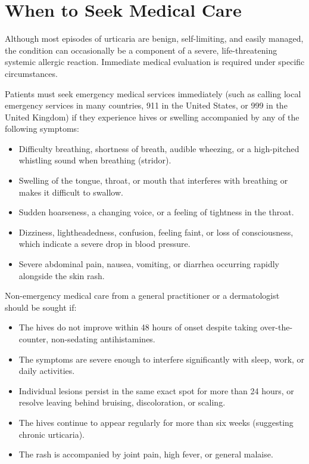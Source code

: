 \section*{When to Seek Medical Care}
Although most episodes of urticaria are benign, self-limiting, and easily managed, the condition can occasionally be a component of a severe, life-threatening systemic allergic reaction. Immediate medical evaluation is required under specific circumstances.

Patients must seek emergency medical services immediately (such as calling local emergency services in many countries, 911 in the United States, or 999 in the United Kingdom) if they experience hives or swelling accompanied by any of the following symptoms:
\begin{itemize}
    \item Difficulty breathing, shortness of breath, audible wheezing, or a high-pitched whistling sound when breathing (stridor).
    \item Swelling of the tongue, throat, or mouth that interferes with breathing or makes it difficult to swallow.
    \item Sudden hoarseness, a changing voice, or a feeling of tightness in the throat.
    \item Dizziness, lightheadedness, confusion, feeling faint, or loss of consciousness, which indicate a severe drop in blood pressure.
    \item Severe abdominal pain, nausea, vomiting, or diarrhea occurring rapidly alongside the skin rash.
\end{itemize}

Non-emergency medical care from a general practitioner or a dermatologist should be sought if:
\begin{itemize}
    \item The hives do not improve within 48 hours of onset despite taking over-the-counter, non-sedating antihistamines.
    \item The symptoms are severe enough to interfere significantly with sleep, work, or daily activities.
    \item Individual lesions persist in the same exact spot for more than 24 hours, or resolve leaving behind bruising, discoloration, or scaling.
    \item The hives continue to appear regularly for more than six weeks (suggesting chronic urticaria).
    \item The rash is accompanied by joint pain, high fever, or general malaise.
\end{itemize}

